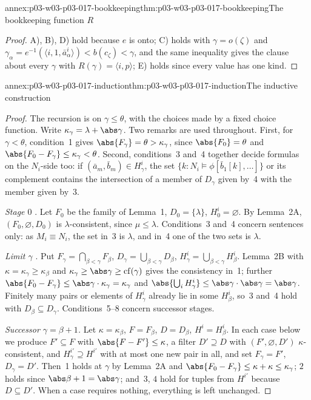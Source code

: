 \begin{annexitem}{annex:p03-w03-p03-017-bookkeeping}{thm:p03-w03-p03-017-bookkeeping}{The bookkeeping function \(R\)}
\begin{proof}
A), B), D) hold because \(e\) is onto; C) holds with \(\gamma=o(\zeta)\) and
\(\gamma_\alpha=e^{-1}(\langle i,1,\bar a^i_\alpha\rangle)<b(c_\zeta)<\gamma\),
and the same inequality gives the clause about every \(\gamma\) with
\(R(\gamma)=\langle i,p\rangle\); E) holds since every value has one kind.
\end{proof}
\end{annexitem}

\begin{annexitem}{annex:p03-w03-p03-017-induction}{thm:p03-w03-p03-017-induction}{The inductive construction}
\begin{proof}
The recursion is on \(\gamma\le\theta\), with the choices made by a fixed
choice function.  Write \(\kappa_\gamma=\lambda+\abs\gamma\).  Two remarks
are used throughout.  First, for \(\gamma<\theta\), condition~1 gives
\(\abs{F_\gamma}=\theta>\kappa_\gamma\), since \(\abs{F_0}=\theta\) and
\(\abs{F_0-F_\gamma}\le\kappa_\gamma<\theta\).  Second, conditions~3 and~4
together decide formulas on the \(N_i\)-side too: if
\((\bar a_m,\bar b_m)\in H^i_\gamma\), the set
\(\{k:N_i\models\phi[\bar b_1[k],\ldots]\}\) or its complement contains the
intersection of a member of \(D_\gamma\) given by~4 with the member given
by~3.

\emph{Stage \(0\)} \cite[p.~232, Case~I]{Shelah1971Ultrapowers}.  Let
\(F_0\) be the family of Lemma~1, \(D_0=\{\lambda\}\), \(H^i_0=\varnothing\).
By Lemma~2A, \((F_0,\varnothing,D_0)\) is \(\lambda\)-consistent, since
\(\mu\le\lambda\).  Conditions~3 and~4 concern sentences only: as
\(M_i\equiv N_i\), the set in~3 is \(\lambda\), and in~4 one of the two sets
is \(\lambda\).

\emph{Limit \(\gamma\)} \cite[p.~232, Case~II]{Shelah1971Ultrapowers}.  Put
\(F_\gamma=\bigcap_{\beta<\gamma}F_\beta\),
\(D_\gamma=\bigcup_{\beta<\gamma}D_\beta\),
\(H^i_\gamma=\bigcup_{\beta<\gamma}H^i_\beta\).  Lemma~2B with
\(\kappa=\kappa_\gamma\ge\kappa_\beta\) and \(\kappa_\gamma\ge\abs\gamma\ge
\mathrm{cf}(\gamma)\) gives the consistency in~1; further
\(\abs{F_0-F_\gamma}\le\abs\gamma\cdot\kappa_\gamma=\kappa_\gamma\) and
\(\abs{\bigcup_iH^i_\gamma}\le\abs\gamma\cdot\abs\gamma=\abs\gamma\).  Finitely
many pairs or elements of \(H^i_\gamma\) already lie in some \(H^i_\beta\),
so~3 and~4 hold with \(D_\beta\subseteq D_\gamma\).  Conditions~5--8 concern
successor stages.

\emph{Successor \(\gamma=\beta+1\).}  Let \(\kappa=\kappa_\beta\),
\(F=F_\beta\), \(D=D_\beta\), \(H^i=H^i_\beta\).  In each case below we
produce \(F'\subseteq F\) with \(\abs{F-F'}\le\kappa\), a filter
\(D'\supseteq D\) with \((F',\varnothing,D')\) \(\kappa\)-consistent, and
\(H^{i'}_\gamma\supseteq H^{i'}\) with at most one new pair in all, and set
\(F_\gamma=F'\), \(D_\gamma=D'\).  Then~1 holds at \(\gamma\) by Lemma~2A and
\(\abs{F_0-F_\gamma}\le\kappa+\kappa\le\kappa_\gamma\); \(2\) holds since
\(\abs\beta+1=\abs\gamma\); and~3, \(4\) hold for tuples from \(H^{i'}\)
because \(D\subseteq D'\).  When a case requires nothing, everything is left
unchanged.


\end{proof}
\end{annexitem}
